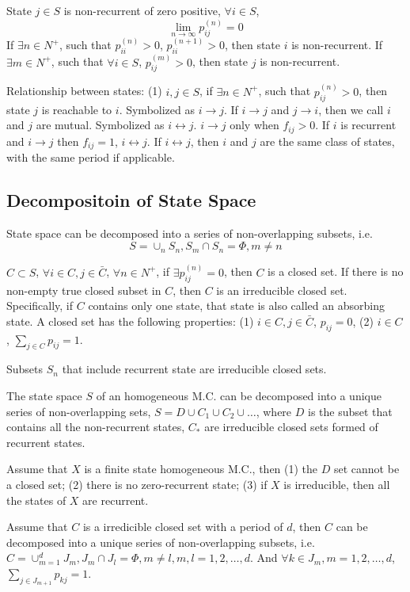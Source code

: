 State $j \in S$ is non-recurrent of zero positive, $\forall i \in S$,
$$\lim_{n\rightarrow\infty} p_{ij}^{(n)} = 0$$
If $\exists n \in N^+$, such that $p_{ii}^{(n)} > 0$, $p_{ii}^{(n+1)} > 0$,
then state $i$ is non-recurrent.
If $\exists m \in N^+$, such that $\forall i \in S$, $p_{ij}^{(m)} > 0$,
then state $j$ is non-recurrent.

Relationship between states: (1) $i,j\in S$, if $\exists n \in N^+$, such
that $p_{ij}^{(n)} > 0$, then state $j$ is reachable to $i$. Symbolized
as $i\rightarrow j$. If $i\rightarrow j$ and $j\rightarrow i$, then we call
$i$ and $j$ are mutual. Symbolized as $i\leftrightarrow j$.
$i\rightarrow j$ only when $f_{ij}>0$. If $i$ is recurrent and $i\rightarrow j$
then $f_{ij} =1$, $i\leftrightarrow j$. If $i\leftrightarrow j$, then $i$ and
$j$ are the same class of states, with the same period if applicable.

\subsection{Decompositoin of State Space}

State space can be decomposed into a series of non-overlapping subsets, i.e.
$$S = \cup_n S_n, S_m\cap S_n = \Phi, m\neq n$$

$C\subset S$, $\forall i \in C, j\in \bar{C}$, $\forall n\in N^+$, if
$\exists p_{ij}^{(n)} = 0$, then $C$ is a closed set. If there is no
non-empty true closed subset in $C$, then $C$ is an irreducible closed set.
Specifically, if $C$ contains only one state, that state is also called
an absorbing state. A closed set has the following properties:
(1) $i\in C, j\in\bar{C}$, $p_{ij} = 0$,
(2) $i\in C$, $\sum_{j\in C} p_{ij} = 1$.

Subsets $S_n$ that include recurrent state are irreducible closed sets.

The state space $S$ of an homogeneous M.C. can be decomposed into a unique
series of non-overlapping sets, $S = D\cup C_1\cup C_2\cup \ldots$, where
$D$ is the subset that contains all the non-recurrent states, $C_*$ are
irreducible closed sets formed of recurrent states.

Assume that $X$ is a finite state homogeneous M.C., then (1) the $D$ set
cannot be a closed set; (2) there is no zero-recurrent state; (3) if $X$
is irreducible, then all the states of $X$ are recurrent.

Assume that $C$ is a irredicible closed set with a period of $d$, then $C$
can be decomposed into a unique series of non-overlapping subsets, i.e.
$C = \cup_{m=1}^d J_m, J_m \cap J_l = \Phi, m\neq l, m,l= 1,2,\ldots, d$.
And $\forall k\in J_m, m=1,2,\ldots,d$, $\sum_{j \in J_{m+1}} p_{kj} = 1$.

